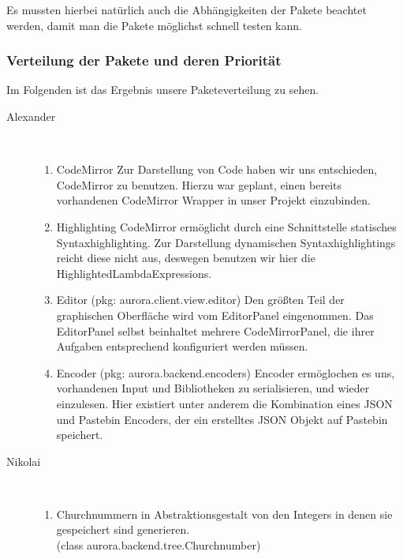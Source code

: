 \documentclass[parskip=full,11pt,twoside]{scrartcl}
\begin{document}
Es mussten hierbei natürlich auch die Abhängigkeiten der Pakete beachtet werden, damit man die Pakete möglichst schnell testen kann.


\subsubsection{Verteilung der Pakete und deren Priorität}
Im Folgenden ist das Ergebnis unsere Paketeverteilung zu sehen.
\begin{description}


    \item [Alexander]\hfill \\
    \begin{enumerate}
        \item CodeMirror
            \newline
            Zur Darstellung von Code haben wir uns entschieden, CodeMirror zu benutzen.
            Hierzu war geplant, einen bereits vorhandenen CodeMirror Wrapper in unser Projekt einzubinden.
        \item Highlighting
            \newline
            CodeMirror ermöglicht durch eine Schnittstelle statisches Syntaxhighlighting.
            Zur Darstellung dynamischen Syntaxhighlightings reicht diese nicht aus, deswegen benutzen wir hier die HighlightedLambdaExpressions.
        \item Editor (pkg: aurora.client.view.editor)
            \newline
            Den größten Teil der graphischen Oberfläche wird vom EditorPanel eingenommen.
            Das EditorPanel selbst beinhaltet mehrere CodeMirrorPanel, die ihrer Aufgaben entsprechend konfiguriert werden müssen.
        \item Encoder (pkg: aurora.backend.encoders)
            \newline
            Encoder ermöglochen es uns, vorhandenen Input und Bibliotheken zu serialisieren, und wieder einzulesen.
            Hier existiert unter anderem die Kombination eines JSON und Pastebin Encoders, der ein erstelltes JSON Objekt auf Pastebin speichert.
    \end{enumerate}
    \item [Nikolai]\hfill \\
    \begin{enumerate}
    \item Churchnummern in Abstraktionsgestalt von den Integers in denen sie gespeichert sind generieren. \\(class aurora.backend.tree.Churchnumber)

\end{enumerate}
\end{description}
\end{document}
